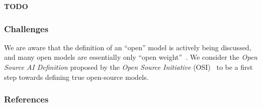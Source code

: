 \documentclass[11pt]{article}
\begin{document}
\textbf{TODO}

\subsubsection{Challenges}

We are aware that the definition of an ``open'' model is actively being discussed, and many open models are essentially only ``open weight''~\cite{Gibney2024}.
We consider the \emph{Open Source AI Definition} proposed by the \emph{Open Source Initiative} (OSI)~\cite{OSIAI2024} to be a first step towards defining true open-source models.

\subsubsection{References}



\end{document}
